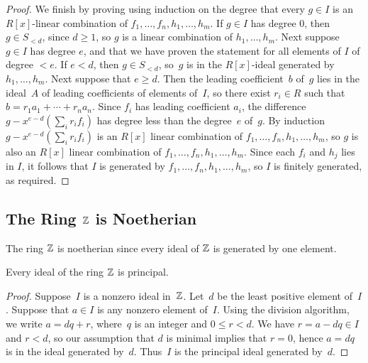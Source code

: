 \begin{proof}
We finish by proving using induction on the degree that every $g\in I$ is an
$R[x]$-linear combination of $f_1,\ldots, f_n, h_1,\ldots, h_m$.
If $g\in I$ has degree $0$, then $g \in S_{<d}$, since $d\geq 1$, so
$g$ is a linear combination of $h_1,\ldots, h_m$.  Next suppose
$g\in I$ has degree $e$, and that we have proven the statement
for all elements of $I$ of degree $<e$.
If $e < d$, then $g\in S_{<d}$, so~$g$ is
in the $R[x]$-ideal generated by $h_1,\ldots, h_m$.  Next suppose
that $e\geq d$.  Then the leading coefficient~$b$
of~$g$ lies in the ideal~$A$ of leading coefficients of elements of~$I$, so there
exist $r_i\in R$ such that $b=r_1 a_1 + \cdots + r_n a_n$.  Since
$f_i$ has leading coefficient $a_i$, the difference
$g- x^{e-d} (\sum_i r_i f_i)$ has degree less than the degree~$e$ of~$g$.  By induction $g-x^{e-d} (\sum_i r_i f_i)$ is an $R[x]$ linear combination of $f_1,\ldots, f_n,
h_1,\ldots, h_m$, so $g$ is also an $R[x]$ linear combination of
$f_1,\ldots, f_n, h_1,\ldots, h_m$.  Since each $f_i$ and $h_j$ lies in
$I$, it follows that $I$ is generated by $f_1,\ldots, f_n, h_1,\ldots,
h_m$, so $I$ is finitely generated, as required.
\end{proof}

\subsection{The Ring $\mathbb{Z}$ is Noetherian}\label{sec:Znoeth}

The ring $\mathbb{Z}$ is noetherian since every ideal of $\mathbb{Z}$ is
generated by one element.
\begin{proposition}\label{prop:zpid}
	Every ideal of the ring $\mathbb{Z}$ is principal.
\end{proposition}
\begin{proof}
	Suppose~$I$ is a nonzero ideal in~$\mathbb{Z}$. Let~$d$ be the least positive
	element of~$I$.  Suppose that $a\in I$ is any nonzero element of~$I$.
	Using the division algorithm, we write $a=dq + r$, where~$q$ is an
	integer and $0\leq r < d$.  We have $r=a-dq\in I$ and $r<d$, so our
	assumption that $d$ is minimal implies that $r=0$, hence $a=dq$ is in
	the ideal generated by~$d$. Thus~$I$ is the principal ideal generated
	by~$d$.
\end{proof}

